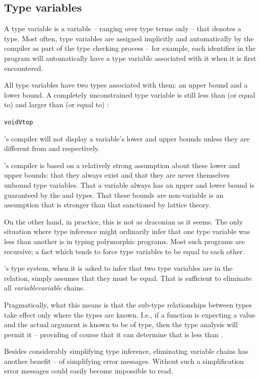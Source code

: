 \subsection{Type variables}
\label{types:standard:variable}

A type variable is a variable -- ranging over type terms only -- that denotes a type. Most often, type variables are assigned implicitly and automatically by the compiler as part of the type checking process -- for example, each identifier in the program will automatically have a type variable associated with it when it is first encountered. 

All type variables have two types associated with them: an upper bound and a lower bound. A completely unconstrained type variable is still less than (or equal to)  and larger than (or equal to) :
\begin{alltt}
void \typearrow V \typearrow top
\end{alltt}
\go's compiler will not display a variable's lower and upper bounds unless they are different from  and  respectively.

\begin{aside}
\go's compiler is based on a relatively strong assumption about these lower and upper bounds: that they always exist and that they are never themselves unbound type variables. That a variable always has an upper and lower bound is guaranteed by the  and  types. That these bounds are non-variable is an assumption that is stronger than that sanctioned by lattice theory.
\end{aside}
\begin{aside}
On the other hand, in practice, this is not as draconian as it seems. The only situation where type inference might ordinarily infer that one type variable was less than another is in typing polymorphic programs. Most such programs are recursive; a fact which tends to force type variables to be equal to each other.
\end{aside}
\begin{aside}
\go's type system, when it is asked to infer that two type variables are in the \typearrow relation, simply assumes that they must be equal. That is sufficient to eliminate all \emph{variable}\typearrow\emph{variable} chains.
\end{aside}
\begin{aside}
Pragmatically, what this means is that the sub-type relationships between types take effect only where the types are known. I.e., if a function is expecting a  value and the actual argument is known to be of  type, then the type analysis will permit it -- providing of course that it can determine that  is less than .
\end{aside}
\begin{aside}
Besides considerably simplifying type inference, eliminating variable chains has another benefit -- of simplifying error messages. Without such a simplification error messages could easily become impossible to read.
\end{aside}


